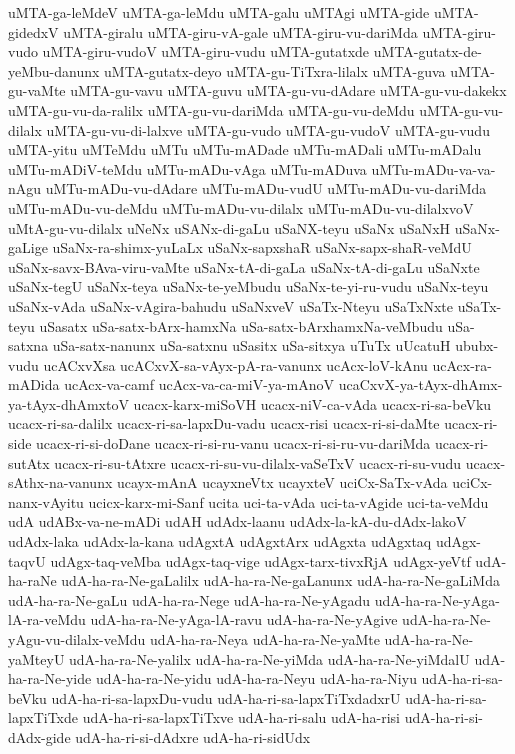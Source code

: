 {uMTA-ga-leMdeV
uMTA-ga-leMdu
uMTA-galu
uMTAgi
uMTA-gide
uMTA-gidedxV
uMTA-giralu
uMTA-giru-vA-gale
uMTA-giru-vu-dariMda
uMTA-giru-vudo
uMTA-giru-vudoV
uMTA-giru-vudu
uMTA-gutatxde
uMTA-gutatx-de-yeMbu-danunx
uMTA-gutatx-deyo
uMTA-gu-TiTxra-lilalx
uMTA-guva
uMTA-gu-vaMte
uMTA-gu-vavu
uMTA-guvu
uMTA-gu-vu-dAdare
uMTA-gu-vu-dakekx
uMTA-gu-vu-da-ralilx
uMTA-gu-vu-dariMda
uMTA-gu-vu-deMdu
uMTA-gu-vu-dilalx
uMTA-gu-vu-di-lalxve
uMTA-gu-vudo
uMTA-gu-vudoV
uMTA-gu-vudu
uMTA-yitu
uMTeMdu
uMTu
uMTu-mADade
uMTu-mADali
uMTu-mADalu
uMTu-mADiV-teMdu
uMTu-mADu-vAga
uMTu-mADuva
uMTu-mADu-va-va-nAgu
uMTu-mADu-vu-dAdare
uMTu-mADu-vudU
uMTu-mADu-vu-dariMda
uMTu-mADu-vu-deMdu
uMTu-mADu-vu-dilalx
uMTu-mADu-vu-dilalxvoV
uMtA-gu-vu-dilalx
uNeNx
uSANx-di-gaLu
uSaNX-teyu
uSaNx
uSaNxH
uSaNx-gaLige
uSaNx-ra-shimx-yuLaLx
uSaNx-sapxshaR
uSaNx-sapx-shaR-veMdU
uSaNx-savx-BAva-viru-vaMte
uSaNx-tA-di-gaLa
uSaNx-tA-di-gaLu
uSaNxte
uSaNx-tegU
uSaNx-teya
uSaNx-te-yeMbudu
uSaNx-te-yi-ru-vudu
uSaNx-teyu
uSaNx-vAda
uSaNx-vAgira-bahudu
uSaNxveV
uSaTx-Nteyu
uSaTxNxte
uSaTx-teyu
uSasatx
uSa-satx-bArx-hamxNa
uSa-satx-bArxhamxNa-veMbudu
uSa-satxna
uSa-satx-nanunx
uSa-satxnu
uSasitx
uSa-sitxya
uTuTx
uUcatuH
ububx-vudu
ucACxvXsa
ucACxvX-sa-vAyx-pA-ra-vanunx
ucAcx-loV-kAnu
ucAcx-ra-mADida
ucAcx-va-camf
ucAcx-va-ca-miV-ya-mAnoV
ucaCxvX-ya-tAyx-dhAmx-ya-tAyx-dhAmxtoV
ucacx-karx-miSoVH
ucacx-niV-ca-vAda
ucacx-ri-sa-beVku
ucacx-ri-sa-dalilx
ucacx-ri-sa-lapxDu-vadu
ucacx-risi
ucacx-ri-si-daMte
ucacx-ri-side
ucacx-ri-si-doDane
ucacx-ri-si-ru-vanu
ucacx-ri-si-ru-vu-dariMda
ucacx-ri-sutAtx
ucacx-ri-su-tAtxre
ucacx-ri-su-vu-dilalx-vaSeTxV
ucacx-ri-su-vudu
ucacx-sAthx-na-vanunx
ucayx-mAnA
ucayxneVtx
ucayxteV
uciCx-SaTx-vAda
uciCx-nanx-vAyitu
ucicx-karx-mi-Sanf
ucita
uci-ta-vAda
uci-ta-vAgide
uci-ta-veMdu
udA
udABx-va-ne-mADi
udAH
udAdx-laanu
udAdx-la-kA-du-dAdx-lakoV
udAdx-laka
udAdx-la-kana
udAgxtA
udAgxtArx
udAgxta
udAgxtaq
udAgx-taqvU
udAgx-taq-veMba
udAgx-taq-vige
udAgx-tarx-tivxRjA
udAgx-yeVtf
udA-ha-raNe
udA-ha-ra-Ne-gaLalilx
udA-ha-ra-Ne-gaLanunx
udA-ha-ra-Ne-gaLiMda
udA-ha-ra-Ne-gaLu
udA-ha-ra-Nege
udA-ha-ra-Ne-yAgadu
udA-ha-ra-Ne-yAga-lA-ra-veMdu
udA-ha-ra-Ne-yAga-lA-ravu
udA-ha-ra-Ne-yAgive
udA-ha-ra-Ne-yAgu-vu-dilalx-veMdu
udA-ha-ra-Neya
udA-ha-ra-Ne-yaMte
udA-ha-ra-Ne-yaMteyU
udA-ha-ra-Ne-yalilx
udA-ha-ra-Ne-yiMda
udA-ha-ra-Ne-yiMdalU
udA-ha-ra-Ne-yide
udA-ha-ra-Ne-yidu
udA-ha-ra-Neyu
udA-ha-ra-Niyu
udA-ha-ri-sa-beVku
udA-ha-ri-sa-lapxDu-vudu
udA-ha-ri-sa-lapxTiTxdadxrU
udA-ha-ri-sa-lapxTiTxde
udA-ha-ri-sa-lapxTiTxve
udA-ha-ri-salu
udA-ha-risi
udA-ha-ri-si-dAdx-gide
udA-ha-ri-si-dAdxre
udA-ha-ri-sidUdx
}
